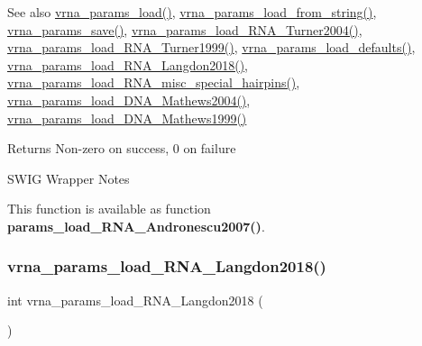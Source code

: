 \begin{DoxySeeAlso}{See also}
\mbox{\hyperlink{group__energy__parameters__rw_gabb0583595c67094986ef90cb4f1c7555}{vrna\+\_\+params\+\_\+load()}}, \mbox{\hyperlink{group__energy__parameters__rw_gabcd9cc7040a6b633b56b1cbd6a14d68e}{vrna\+\_\+params\+\_\+load\+\_\+from\+\_\+string()}}, \mbox{\hyperlink{group__energy__parameters__rw_ga0de3731b3e4017c52bd678549f6c4ae5}{vrna\+\_\+params\+\_\+save()}}, \mbox{\hyperlink{group__energy__parameters__rw_ga7327fe66ef60c33ba80a87c04db0ee83}{vrna\+\_\+params\+\_\+load\+\_\+\+R\+N\+A\+\_\+\+Turner2004()}}, \mbox{\hyperlink{group__energy__parameters__rw_ga804393b6dfe06a2c6cae89219dffabb1}{vrna\+\_\+params\+\_\+load\+\_\+\+R\+N\+A\+\_\+\+Turner1999()}}, \mbox{\hyperlink{group__energy__parameters__rw_ga413bc688695c9a707dbcc678412d6792}{vrna\+\_\+params\+\_\+load\+\_\+defaults()}}, \mbox{\hyperlink{group__energy__parameters__rw_ga3a87fe5e73eb906c0fa26f2c42c787fd}{vrna\+\_\+params\+\_\+load\+\_\+\+R\+N\+A\+\_\+\+Langdon2018()}}, \mbox{\hyperlink{group__energy__parameters__rw_ga00e07504d66dc24aca7befb4bdaa0db1}{vrna\+\_\+params\+\_\+load\+\_\+\+R\+N\+A\+\_\+misc\+\_\+special\+\_\+hairpins()}}, \mbox{\hyperlink{group__energy__parameters__rw_gafa45b5734355baa634ca0a2e2857563e}{vrna\+\_\+params\+\_\+load\+\_\+\+D\+N\+A\+\_\+\+Mathews2004()}}, \mbox{\hyperlink{group__energy__parameters__rw_ga4d897130a700f86b7d4035a95f25615a}{vrna\+\_\+params\+\_\+load\+\_\+\+D\+N\+A\+\_\+\+Mathews1999()}}
\end{DoxySeeAlso}
\begin{DoxyReturn}{Returns}
Non-\/zero on success, 0 on failure
\end{DoxyReturn}
\begin{DoxyRefDesc}{S\+W\+I\+G Wrapper Notes}
\item[\mbox{\hyperlink{wrappers__wrappers000104}{S\+W\+I\+G Wrapper Notes}}]This function is available as function {\bfseries{params\+\_\+load\+\_\+\+R\+N\+A\+\_\+\+Andronescu2007()}}. \end{DoxyRefDesc}
\mbox{\label{group__energy__parameters__rw_ga3a87fe5e73eb906c0fa26f2c42c787fd}} 
\subsubsection{\texorpdfstring{vrna\_params\_load\_RNA\_Langdon2018()}{vrna\_params\_load\_RNA\_Langdon2018()}}
{\footnotesize\ttfamily int vrna\+\_\+params\+\_\+load\+\_\+\+R\+N\+A\+\_\+\+Langdon2018 (\begin{DoxyParamCaption}\item[{void}]{ }\end{DoxyParamCaption})}




